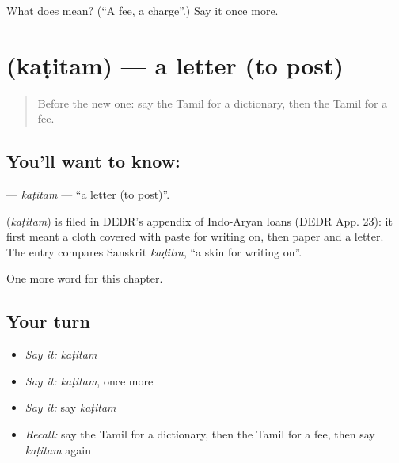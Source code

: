 \begin{tcolorbox}[breakable,colback=teal!4,colframe=teal!35!black,title={Before you move on}]
What does  mean? (\textquotedblleft{}A fee, a charge\textquotedblright{}.) Say it once more.
\end{tcolorbox}
\section[\texorpdfstring{\ta{கடிதம்} (kaṭitam)}{கடிதம் (kaṭitam)}]{ (kaṭitam) — a letter (to post)}

\label{lesson:TA-C215-katitam}



\begin{quote}
Before the new one: say the Tamil for a dictionary, then the Tamil for a fee.
\end{quote}

\subsection*{You'll want to know: }
\textbf{} — \emph{kaṭitam} — \textquotedblleft{}a letter (to post)\textquotedblright{}.

\begin{cousinweb}
\textbf{} (\emph{kaṭitam}) is filed in DEDR's appendix of Indo-Aryan loans (DEDR App. 23): it first meant a cloth covered with paste for writing on, then paper and a letter. The entry compares Sanskrit \emph{kaḍitra}, \textquotedblleft{}a skin for writing on\textquotedblright{}.
\end{cousinweb}

\begin{grammarlens}[title={What you've built}]
One more word for this chapter.
\end{grammarlens}

\subsection*{Your turn}
\begin{itemize}
\raggedright
  \item \emph{Say it:} \emph{kaṭitam}
  \item \emph{Say it:} \emph{kaṭitam}, once more
  \item \emph{Say it:} say \emph{kaṭitam}
  \item \emph{Recall:} say the Tamil for a dictionary, then the Tamil for a fee, then say \emph{kaṭitam} again
\end{itemize}

